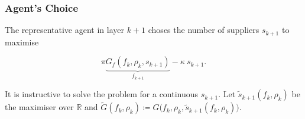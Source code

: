 \documentclass[american, abstract=on]{scrartcl}
\theoremstyle{plain}
\renewcommand{\Re}{\mathbb{R}}
\begin{document}
\subsubsection{Agent's Choice}

The representative agent in layer $k + 1$ choses the number of suppliers $s_{k+1}$ to maximise

\begin{equation}
  \pi \underbrace{G_f(f_k, \rho_k, s_{k + 1})}_{f_{k + 1}} - \kappa \  s_{k + 1}.
\end{equation}

It is instructive to solve the problem for a continuous $s_{k+1}$. Let $\tilde{s}_{k + 1}(f_k, \rho_k)$ be the maximiser over $\Re$ and $\tilde{G}(f_k, \rho_k) \coloneqq G\big(f_k, \rho_k,  \tilde{s}_{k + 1}(f_k, \rho_k)\big)$.

\newpage
\nocite{*}
\printbibliography

\newpage
\appendix

\end{document}
